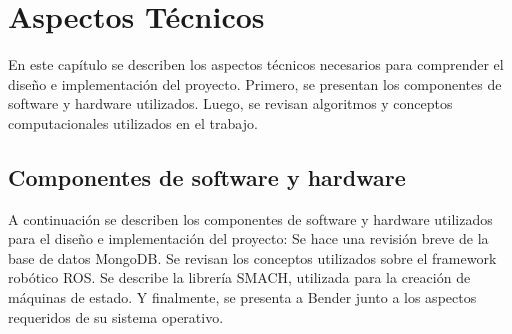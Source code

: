\chapter{Aspectos Técnicos}\label{chapter:technical}

En este capítulo se describen los aspectos técnicos necesarios para comprender el diseño e implementación del proyecto. Primero, se presentan los componentes de software y hardware utilizados. Luego, se revisan algoritmos y conceptos computacionales utilizados en el trabajo.






\section{Componentes de software y hardware}

A continuación se describen los componentes de software y hardware utilizados para el diseño e implementación del proyecto: Se hace una revisión breve de la base de datos MongoDB. Se revisan los conceptos utilizados sobre el framework robótico ROS. Se describe la librería SMACH, utilizada para la creación de máquinas de estado. Y finalmente, se presenta a Bender junto a los aspectos requeridos de su sistema operativo.

